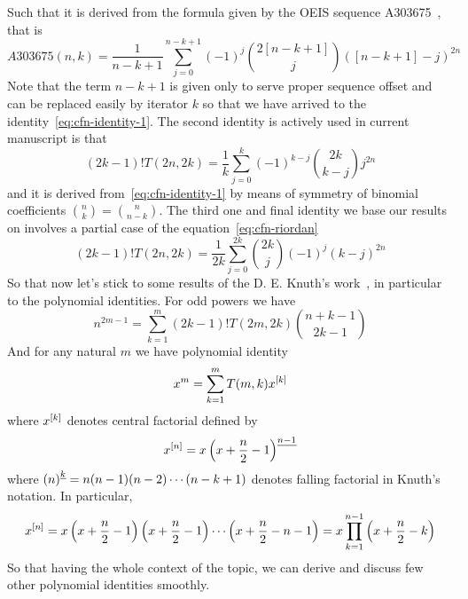 Such that it is derived from the formula given by the OEIS sequence A303675~\cite{kolosov2018coefficients}, that is
\begin{equation*}
    A303675(n,k) = \frac{1}{n-k+1} \sum_{j=0}^{n-k+1} (-1)^{j} \binom{2[n-k+1]}{j} ([n-k+1]-j)^{2n}
\end{equation*}
Note that the term $n-k+1$ is given only to serve proper sequence offset and can be replaced easily by iterator $k$
so that we have arrived to the identity~\eqref{eq:cfn-identity-1}.
The second identity is actively used in current manuscript is that
\begin{equation}
(2k-1)
    !T(2n,2k) = \frac{1}{k} \sum_{j=0}^{k} (-1)^{k-j} \binom{2k}{k-j} j^{2n}\label{eq:cfn-identity-2}
\end{equation}
and it is derived from~\eqref{eq:cfn-identity-1} by means
of symmetry of binomial coefficients $\binom{n}{k} = \binom{n}{n-k}$.
The third one and final identity we base our results on involves a partial case of the equation~\eqref{eq:cfn-riordan}
\begin{equation}
(2k-1)
    !T(2n, 2k) = \frac{1}{2k} \sum_{j=0}^{2k} \binom{2k}{j} (-1)^{j} (k-j)^{2n}\label{eq:cfn-identity-3}
\end{equation}
So that now let's stick to some results of the D. E. Knuth's work~\cite{knuth1993johann},
in particular to the polynomial identities.
For odd powers we have
\begin{equation}
    n^{2m-1} = \sum_{k=1}^{m} (2k-1)! T(2m,2k) \binom{n+k-1}{2k-1}\label{eq:knuth-odd-power}
\end{equation}
And for any natural $m$ we have polynomial identity
\begin{equation}
    x^m = \sum_{k=1}^{m} T(m, k) x^{[k]}\label{eq:knuth-power-identity}
\end{equation}
where $x^{[k]}$ denotes central factorial defined by
\begin{equation*}
    x^{[n]} = x \left(x+\frac{n}{2}-1 \right)^{\underline{n-1}}
\end{equation*}
where $\left(n \right)^{\underline{k}} = n (n-1) (n-2) \cdots (n-k+1)$ denotes falling factorial in Knuth's notation.
In particular,
\begin{equation*}
    x^{[n]}
    = x \left( x+\frac{n}{2}-1 \right) \left( x+\frac{n}{2}-1 \right) \cdots \left (x+\frac{n}{2}-n-1 \right)
    = x \prod_{k=1}^{n-1} \left( x+\frac{n}{2}-k \right)
\end{equation*}
So that having the whole context of the topic, we can derive and discuss few other polynomial identities smoothly.
